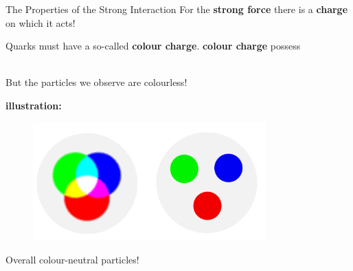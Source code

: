 \begin{frame}{The Properties of the Strong Interaction} 
For the \textbf{strong force} there is a \textbf{charge} on which it acts! \\ \pause
\begin{itemise}
\begin{itemise}
    \item [\ding{220}] Quarks must have a so-called \textbf{colour charge}. \textbf{colour charge} possess\\\
    \item[] But the particles we observe are colourless! \\
    \end{itemise}
   \item[] \textbf{illustration:}
\end{itemise} \vspace{-0.5cm}
    \begin{figure}[htb]                                                 
    \includegraphics[width=0.8\textwidth]{Figures Introductory Lecture/Standard Model/GrayAdditiveColours.png}          
    \label{fig:strong_force_3}                                         
    \end{figure} \vspace{-0.5cm} \pause
     Overall colour-neutral particles!
\end{frame} 


